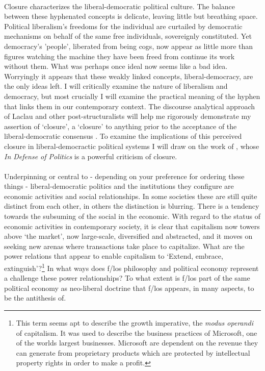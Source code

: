 \documentclass{article}
\begin{document}
\begin{doublespace}
\paragraph{}Closure characterizes the liberal-democratic political culture. The balance between these hyphenated concepts is delicate, leaving little but breathing space. Political liberalism's freedoms for the individual are curtailed by democratic mechanisms on behalf of the same free individuals, sovereignly constituted. Yet democracy's 'people', liberated from being cogs, now appear as little more than figures watching the machine they have been freed from continue its work without them. What was perhaps once ideal now seems like a bad idea. Worryingly it appears that these weakly linked concepts, liberal-democracy, are the only ideas left. I will critically examine the nature of liberalism and democracy, but most crucially I will examine the practical meaning of the hyphen that links them in our contemporary context. The discourse analytical approach of Laclau \cite{Laclau:2004dn} and other post-structuralists will help me rigorously demonstrate my assertion of `closure', a `closure' to anything prior to the acceptance of the liberal-democratic consensus \cite{Mouffe:2000fk}. To examine the implications of this perceived closure in liberal-democractic political systems I will draw on the work of , whose \emph{In Defense of Politics} is a powerful criticism of closure.

\paragraph{}Underpinning or central to - depending on your preference for ordering these things - liberal-democratic politics and the institutions they configure are economic activities and social relationships. In some societies these are still quite distinct from each other, in others the distinction is blurring. There is a  tendency towards the subsuming of the social in the economic. With regard to the status of economic activities in contemporary society, it is clear that capitalism now towers above `the market', now large-scale, diversified and abstracted, and it moves on seeking new arenas where transactions take place to capitalize. What are the power relations that appear to enable capitalism to `Extend, embrace, extinguish'?\footnote{This term seems apt to describe the growth imperative, the \emph{modus operandi} of capitalism. It was used to describe the business practices of Microsoft, one of the worlds largest businesses. Microsoft are dependent on the revenue they can generate from proprietary products which are protected by intellectual property rights in order to make a profit.} In what ways does f/los philosophy and political economy represent a challenge these power relationships? To what extent is f/los part of the same political economy as neo-liberal doctrine that f/los appears, in many aspects, to be the antithesis of.


\end{doublespace}
\end{document}
